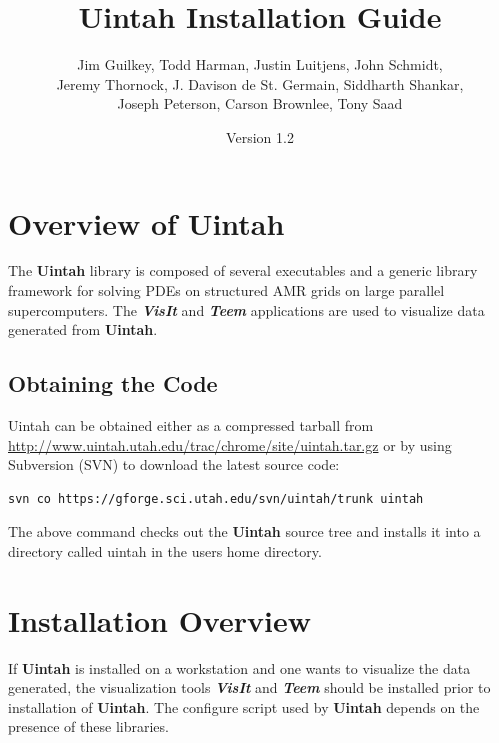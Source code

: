 \documentclass[12pt]{article}
\begin{document}
\title{Uintah Installation Guide}

\author{Jim Guilkey, Todd Harman, Justin Luitjens, John Schmidt,
  \\ Jeremy Thornock,
  J. Davison de St. Germain, Siddharth Shankar, \\
  Joseph Peterson,  
  Carson Brownlee,
  Tony Saad}

\date{Version 1.2}

\maketitle



\newpage

\tableofcontents

\newpage

\section{Overview of Uintah} \label{sec:overview}
The \textbf{Uintah} library is composed of several executables and a
generic library framework for solving PDEs on structured AMR grids on
large parallel supercomputers. The \textbf{\emph{VisIt}} and
\textbf{\emph{Teem}} applications are used to visualize data generated
from \textbf{Uintah}.

\subsection{Obtaining the Code}
Uintah can be obtained either as a compressed tarball from
\url{http://www.uintah.utah.edu/trac/chrome/site/uintah.tar.gz} or by using
Subversion (SVN) to download the latest source code:

\begin{verbatim}
svn co https://gforge.sci.utah.edu/svn/uintah/trunk uintah
\end{verbatim}

The above command checks out the \textbf{Uintah} source tree and
installs it into a directory called uintah in the users home
directory.


\section{Installation Overview}

If \textbf{Uintah} is installed on a workstation and one wants to
visualize the data generated, the visualization tools
\textbf{\emph{VisIt}} and \textbf{\emph{Teem}} should be installed
prior to installation of \textbf{Uintah}.  The configure script used by
\textbf{Uintah} depends on the presence of these libraries.
\end{document}
